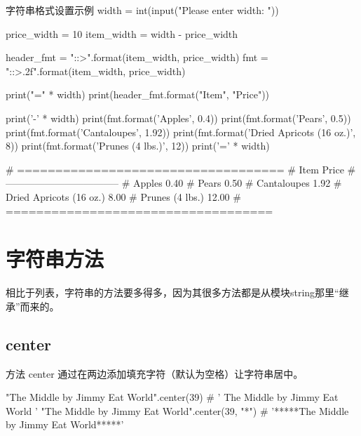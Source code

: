 \begin{py}{字符串格式设置示例}
width = int(input("Please enter width: "))

price_width = 10
item_width = width - price_width

header_fmt = "{{:{}}}{{:>{}}}".format(item_width, price_width)
fmt = "{{:{}}}{{:>{}.2f}}".format(item_width, price_width)

print("=" * width)
print(header_fmt.format("Item", "Price"))

print('-' * width)
print(fmt.format('Apples', 0.4))
print(fmt.format('Pears', 0.5))
print(fmt.format('Cantaloupes', 1.92))
print(fmt.format('Dried Apricots (16 oz.)', 8))
print(fmt.format('Prunes (4 lbs.)', 12))
print('=' * width)

# ===================================
# Item                          Price
# -----------------------------------
# Apples                         0.40
# Pears                          0.50
# Cantaloupes                    1.92
# Dried Apricots (16 oz.)        8.00
# Prunes (4 lbs.)               12.00
# ===================================
\end{py}
\section{字符串方法}
相比于列表，字符串的方法要多得多，因为其很多方法都是从模块string那里“继承”而来的。


\subsection{center}
方法 center 通过在两边添加填充字符（默认为空格）让字符串居中。
\begin{pyc}
"The Middle by Jimmy Eat World".center(39)
# '     The Middle by Jimmy Eat World     '
"The Middle by Jimmy Eat World".center(39, "*")
# '*****The Middle by Jimmy Eat World*****'
\end{pyc}
